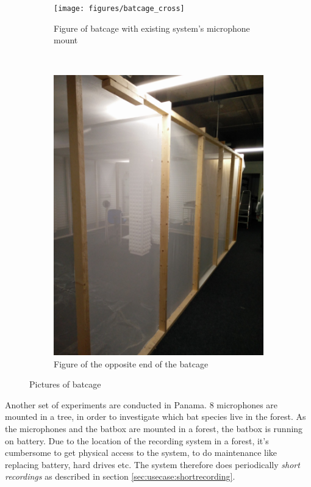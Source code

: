 \begin{figure}[!h]
    \centering
    \begin{subfigure}[b]{0.45\textwidth}
        \texttt{[image: figures/batcage\_cross]}
        \caption{Figure of batcage with existing system's microphone mount}
        \label{fig:gull}
    \end{subfigure}
    ~ %
    \begin{subfigure}[b]{0.45\textwidth}
        \includegraphics[width=\textwidth]{figures/batcage}
        \caption{Figure of the opposite end of the batcage}
        \label{fig:mouse}
    \end{subfigure}
    \caption{Pictures of batcage}\label{fig:usecase:batcage}
\end{figure}

Another set of experiments are conducted in Panama. 8 microphones are mounted in a tree, in order to investigate which bat species live in the forest. As the microphones and the batbox are mounted in a forest, the batbox is running on battery. Due to the location of the recording system in a forest, it's cumbersome to get physical access to the system, to do maintenance like replacing battery, hard drives etc. The system therefore does periodically \textit{short recordings} as described in section \ref{sec:usecase:shortrecording}. 

